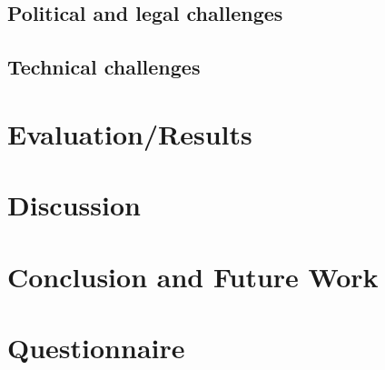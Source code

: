 \subsection{Political and legal challenges}


\subsection{Technical challenges}


\section{Evaluation/Results}


\section{Discussion}



\section{Conclusion and Future Work}






\appendix
\section{Questionnaire}


